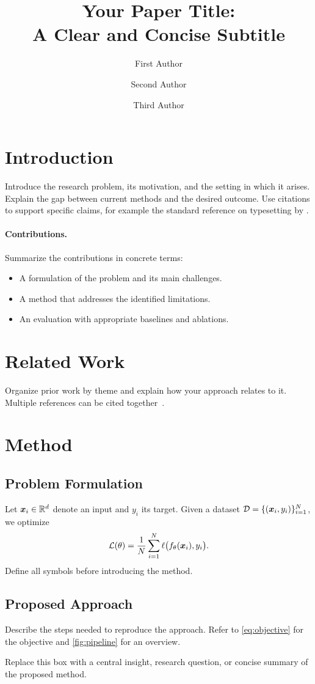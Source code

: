 \documentclass[twocolumn]{paper}
\title{Your Paper Title:\\A Clear and Concise Subtitle}
\author[1]{First Author}
\author[1]{Second Author}
\author[1\corrauthor]{Third Author}
\affiliation[1]{School of Your Discipline, Jilin University, Changchun, China}
\begin{document}
\maketitle
\section{Introduction}
Introduce the research problem, its motivation, and the setting in which it
arises. Explain the gap between current methods and the desired outcome.
Use citations to support specific claims, for example the standard reference
on typesetting by \citet{lamport1994latex}.

\paragraph{Contributions.}
Summarize the contributions in concrete terms:
\begin{itemize}
  \item A formulation of the problem and its main challenges.
  \item A method that addresses the identified limitations.
  \item An evaluation with appropriate baselines and ablations.
\end{itemize}

\section{Related Work}
Organize prior work by theme and explain how your approach relates to it.
Multiple references can be cited together~\citep{lamport1994latex,knuth1984texbook}.

\section{Method}
\subsection{Problem Formulation}
Let $\bm{x}_i\in\mathbb{R}^d$ denote an input and $y_i$ its target. Given a dataset
$\mathcal{D}=\{(\bm{x}_i,y_i)\}_{i=1}^N$, we optimize
\begin{equation}
  \mathcal{L}(\theta)=\frac{1}{N}\sum_{i=1}^N
  \ell\bigl(f_\theta(\bm{x}_i),y_i\bigr).
  \label{eq:objective}
\end{equation}
Define all symbols before introducing the method.

\subsection{Proposed Approach}
Describe the steps needed to reproduce the approach. Refer to
\cref{eq:objective} for the objective and \cref{fig:pipeline} for an overview.
\begin{highlightbox}
Replace this box with a central insight, research question, or concise
summary of the proposed method.
\end{highlightbox}
\end{document}
